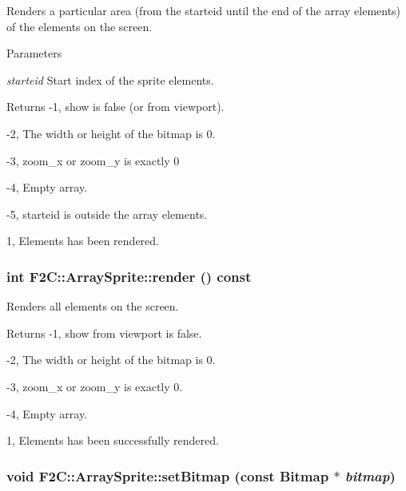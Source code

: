 Renders a particular area (from the starteid until the end of the array elements) of the elements on the screen. 
\begin{DoxyParams}{Parameters}
\item[{\em starteid}]Start index of the sprite elements. \end{DoxyParams}
\begin{DoxyReturn}{Returns}
-\/1, show is false (or from viewport). 

-\/2, The width or height of the bitmap is 0. 

-\/3, zoom\_\-x or zoom\_\-y is exactly 0 

-\/4, Empty array. 

-\/5, starteid is outside the array elements. 

1, Elements has been rendered. 
\end{DoxyReturn}
\hypertarget{class_f2_c_1_1_array_sprite_a3dc5b27cc09b3ee7b2817e5503ab0678}{
\subsubsection[{render}]{\setlength{\rightskip}{0pt plus 5cm}int F2C::ArraySprite::render () const}}
\label{class_f2_c_1_1_array_sprite_a3dc5b27cc09b3ee7b2817e5503ab0678}


Renders all elements on the screen. \begin{DoxyReturn}{Returns}
-\/1, show from viewport is false. 

-\/2, The width or height of the bitmap is 0. 

-\/3, zoom\_\-x or zoom\_\-y is exactly 0. 

-\/4, Empty array. 

1, Elements has been successfully rendered. 
\end{DoxyReturn}
\hypertarget{class_f2_c_1_1_array_sprite_af4812f3e122823e29d8d6f82d64799ac}{
\subsubsection[{setBitmap}]{\setlength{\rightskip}{0pt plus 5cm}void F2C::ArraySprite::setBitmap (const {\bf Bitmap} $\ast$ {\em bitmap})}}
\label{class_f2_c_1_1_array_sprite_af4812f3e122823e29d8d6f82d64799ac}


